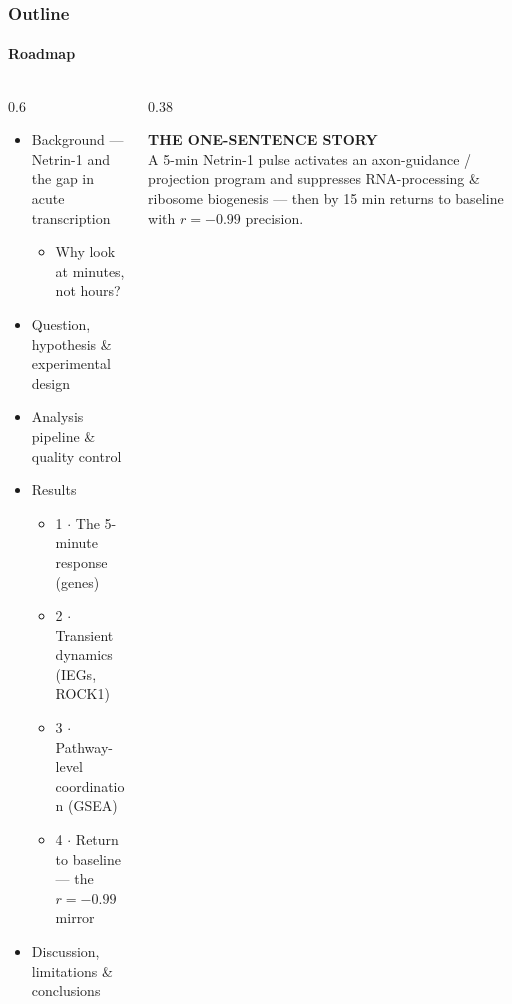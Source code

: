 \documentclass[aspectratio=169,11pt]{beamer}
\begin{document}
\begin{frame}
  \frametitle{Outline}\framesubtitle{Roadmap}
  \begin{columns}[T]
    \begin{column}{0.6\textwidth}
      \begin{itemize}\setlength\itemsep{4pt}
        \item Background --- Netrin-1 and the gap in acute transcription
          \begin{itemize}\item Why look at minutes, not hours?\end{itemize}
        \item Question, hypothesis \& experimental design
        \item Analysis pipeline \& quality control
        \item Results
          \begin{itemize}
            \item 1 $\cdot$ The 5-minute response (genes)
            \item 2 $\cdot$ Transient dynamics (IEGs, ROCK1)
            \item 3 $\cdot$ Pathway-level coordination (GSEA)
            \item 4 $\cdot$ Return to baseline --- the $r=-0.99$ mirror
          \end{itemize}
        \item Discussion, limitations \& conclusions
      \end{itemize}
    \end{column}
    \begin{column}{0.38\textwidth}
      \colorbox{lbg}{\parbox{\textwidth}{\vskip2pt
        {\color{teald}\scriptsize\bfseries THE ONE-SENTENCE STORY}\\[3pt]
        \small A 5-min Netrin-1 pulse activates an axon-guidance / projection
        program and suppresses RNA-processing \& ribosome biogenesis --- then by
        15 min returns to baseline with $r=-0.99$ precision.\vskip3pt}}
    \end{column}
  \end{columns}
\end{frame}
\end{document}
